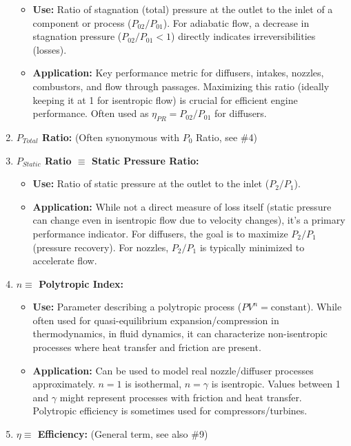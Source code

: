 \begin{enumerate}
  \begin{itemize}
  \tightlist
  \item
    \textbf{Use:} Ratio of stagnation (total) pressure at the outlet to
    the inlet of a component or process (\(P_{02}/P_{01}\)). For
    adiabatic flow, a decrease in stagnation pressure
    (\(P_{02}/P_{01} < 1\)) directly indicates irreversibilities
    (losses).
  \item
    \textbf{Application:} Key performance metric for diffusers, intakes,
    nozzles, combustors, and flow through passages. Maximizing this
    ratio (ideally keeping it at 1 for isentropic flow) is crucial for
    efficient engine performance. Often used as
    \(\eta_{PR} = P_{02}/P_{01}\) for diffusers.
  \end{itemize}
\item
  \textbf{\(P_{Total}\) Ratio:} (Often synonymous with \(P_0\) Ratio,
  see \#4)
\item
  \textbf{\(P_{Static}\) Ratio \(\equiv\) Static Pressure Ratio:}

  \begin{itemize}
  \tightlist
  \item
    \textbf{Use:} Ratio of static pressure at the outlet to the inlet
    (\(P_2/P_1\)).
  \item
    \textbf{Application:} While not a direct measure of loss itself
    (static pressure can change even in isentropic flow due to velocity
    changes), it's a primary performance indicator. For diffusers, the
    goal is to maximize \(P_2/P_1\) (pressure recovery). For nozzles,
    \(P_2/P_1\) is typically minimized to accelerate flow.
  \end{itemize}
\item
  \textbf{\(n \equiv\) Polytropic Index:}

  \begin{itemize}
  \tightlist
  \item
    \textbf{Use:} Parameter describing a polytropic process
    (\(PV^n = \text{constant}\)). While often used for quasi-equilibrium
    expansion/compression in thermodynamics, in fluid dynamics, it can
    characterize non-isentropic processes where heat transfer and
    friction are present.
  \item
    \textbf{Application:} Can be used to model real nozzle/diffuser
    processes approximately. \(n=1\) is isothermal, \(n=\gamma\) is
    isentropic. Values between 1 and \(\gamma\) might represent
    processes with friction and heat transfer. Polytropic efficiency is
    sometimes used for compressors/turbines.
  \end{itemize}
\item
  \textbf{\(\eta \equiv\) Efficiency:} (General term, see also \#9)


\end{enumerate}
